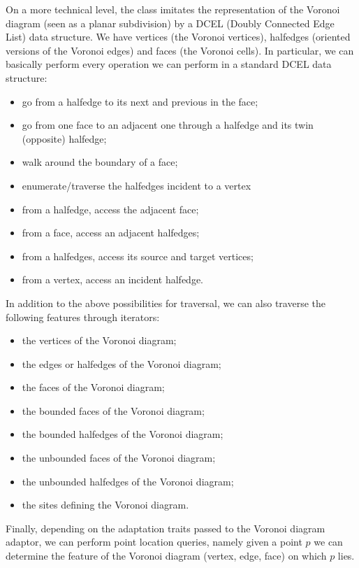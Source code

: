 On a more technical level, the 
class imitates the representation of the Voronoi diagram (seen as a
planar subdivision) by a DCEL (Doubly Connected Edge List) data
structure. We have vertices (the Voronoi vertices), halfedges
(oriented versions of the Voronoi edges) and faces (the Voronoi
cells). In particular, we can basically perform every operation we can
perform in a standard DCEL data structure:
\begin{itemize}
\item go from a halfedge to its next and previous in the face;
\item go from one face to an adjacent one through a halfedge and its
  twin (opposite) halfedge;
\item walk around the boundary of a face;
\item enumerate/traverse the halfedges incident to a vertex
\item from a halfedge, access the adjacent face;
\item from a face, access an adjacent halfedges;
\item from a halfedges, access its source and target vertices;
\item from a vertex, access an incident halfedge.
\end{itemize}
In addition to the above possibilities for traversal, we can also
traverse the following features through iterators:
\begin{itemize}
\item the vertices of the Voronoi diagram;
\item the edges or halfedges of the Voronoi diagram;
\item the faces of the Voronoi diagram;
\item the bounded faces of the Voronoi diagram;
\item the bounded halfedges of the Voronoi diagram;
\item the unbounded faces of the Voronoi diagram;
\item the unbounded halfedges of the Voronoi diagram;
\item the sites defining the Voronoi diagram.
\end{itemize}

Finally, depending on the adaptation traits passed to the Voronoi diagram
adaptor, we can perform point location queries, namely given a point
$p$ we can determine the feature of the Voronoi diagram (vertex, edge,
face) on which $p$ lies.

